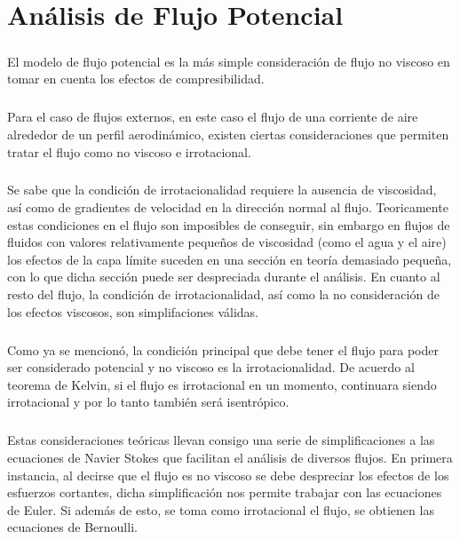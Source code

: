 \documentclass[letterpaper, openright, 12pt]{book}
\begin{document}
%
%
%
%
%

\chapter{Análisis de Flujo Potencial}\label{chap:potential}
    \paragraph*{}
        El modelo de flujo potencial es la más simple consideración de flujo no viscoso en
        tomar en cuenta los efectos de compresibilidad.

    \paragraph*{}
        Para el caso de flujos externos, en este caso el flujo de una corriente
        de aire alrededor de un perfil aerodinámico, existen ciertas
        consideraciones que permiten tratar el flujo como no viscoso e
        irrotacional.

    \paragraph*{}
        Se sabe que la condición de irrotacionalidad requiere la ausencia de
        viscosidad, así como de gradientes de velocidad en la dirección normal
        al flujo. Teoricamente estas condiciones en el flujo son imposibles de
        conseguir, sin embargo en flujos de fluidos con valores relativamente
        pequeños de viscosidad (como el agua y el aire) los efectos de la capa
        límite suceden en una sección en teoría demasiado pequeña, con lo  que
        dicha sección puede ser despreciada durante el análisis. En cuanto al
        resto del flujo, la condición de irrotacionalidad, así como la no
        consideración de los efectos viscosos, son simplifaciones válidas.

    \paragraph*{}
        Como ya se mencionó, la condición principal que debe tener el flujo
        para poder ser considerado potencial y no viscoso es la
        irrotacionalidad. De acuerdo al teorema de Kelvin, si el flujo es
        irrotacional en un momento, continuara siendo irrotacional y por lo
        tanto también será isentrópico.

    \paragraph*{}
        Estas consideraciones teóricas llevan consigo una serie de
        simplificaciones a las ecuaciones de Navier Stokes que facilitan el
        análisis de diversos flujos. En primera instancia, al decirse que el
        flujo es no viscoso se debe despreciar los efectos de los esfuerzos
        cortantes, dicha simplificación nos permite trabajar con las ecuaciones
        de Euler. Si además de esto, se toma como irrotacional el flujo, se
        obtienen las ecuaciones de Bernoulli.
\end{document}

